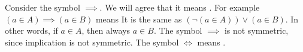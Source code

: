 
Consider the symbol $\implies$.
We will agree that it means .
For example $(a \in A) \implies (a \in B)$ means 
It is the same as $(\neg(a \in A)) \lor (a \in B)$.
In other words, if $a \in A$, then always $a \in B$.
The symbol $\implies$ is not symmetric, since implication is not symmetric.
The symbol $\iff$ means .

%
%
%
%
%
